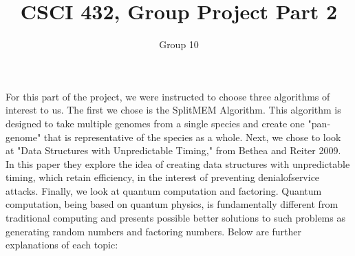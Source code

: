 \documentclass[11pt]{article}
\title{CSCI 432, Group Project Part 2}
\author{Group 10}
\begin{document}
\maketitle

For this part of the project, we were instructed to choose three
algorithms of interest to us. The first we chose is the SplitMEM
Algorithm. This algorithm is designed to take multiple genomes
from a single species and create one "pan­genome" that is
representative of the species as a whole. Next, we chose to look
at "Data Structures with Unpredictable Timing," from Bethea and
Reiter 2009. In this paper they explore the idea of creating data
structures with unpredictable timing, which retain efficiency, in
the interest of preventing denial­of­service attacks. Finally, we
look at quantum computation and factoring. Quantum computation,
being based on quantum physics, is fundamentally different from
traditional computing and presents possible better solutions to
such problems as generating random numbers and factoring numbers.
Below are further explanations of each topic:
\end{document}
